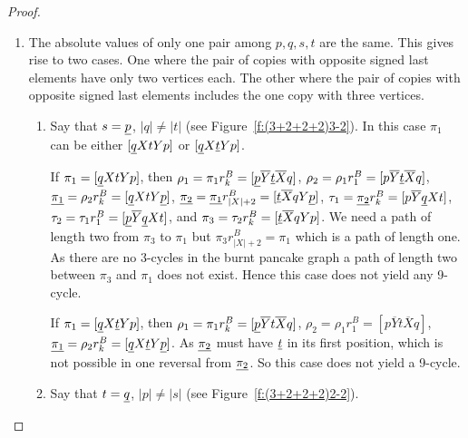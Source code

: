 \documentclass[final]{dmtcs-episciences}
\numberwithin{equation}{section}
\begin{document}
\begin{proof}
\begin{enumerate}
\begin{enumerate}
    \item The absolute values of only one pair among $p,q,s,t$ are the same. This gives rise to two cases. One where the pair of copies with opposite signed last elements have only two vertices each. The other where the pair of copies with opposite signed last elements includes the one copy with three vertices.
    
   
   
    \begin{enumerate}
        \item Say that $s=\uline{p}$, $|q| \neq |t|$ (see Figure~\ref{f:(3+2+2+2)3-2}). In this case $\pi_{1}$ can be either $[\uline{q} X t Y p]$ or $[\uline{q} X \uline{t} Y p]$. 
        
        If $\pi_{1}=[\uline{q} X t Y p]$, then $\rho_{1}=\pi_{1}r^B_k=[\uline{p} \overline{Y} \uline{t} \overline{X} q]$, $\rho_{2}=\rho_{1}r^B_1=[p \overline{Y} \uline{t} \overline{X} q]$, $\uline{\pi_{1}}=\rho_{2}r^B_k=[\uline{q} X t Y \uline{p}]$, $\uline{\pi_{2}}=\uline{\pi_{1}}r^B_{|X|+2}=[\uline{t} \overline{X} q Y \uline{p}]$, $\tau_{1}=\uline{\pi_{2}}r^B_k=[p \overline{Y} \uline{q} X t]$, $\tau_{2}=\tau_{1}r^B_1=[\uline{p} \overline{Y} \uline{q} X t]$, and  $\pi_{3}=\tau_{2}r^B_k=[\uline{t} \overline{X} q Y p]$. We need a path of length two from $\pi_{3}$ to $\pi_{1}$ but $\pi_{3}r^B_{|X|+2}=\pi_{1}$ which is a path of length one. As there are no 3-cycles in the burnt pancake graph a path of length two between $\pi_{3}$ and $\pi_{1}$ does not exist. Hence this case does not yield any 9-cycle.
        
        If $\pi_{1}=[\uline{q} X \uline{t} Y p]$, then $\rho_{1}=\pi_{1}r^B_k=[\uline{p} \overline{Y} t \overline{X} q]$, $\rho_{2}=\rho_{1}r^B_1=[p \overline{Y} t \overline{X} q]$, $\uline{\pi_{1}}=\rho_{2}r^B_k=[\uline{q} X \uline{t} Y \uline{p}]$. As $\uline{\pi_{2}}$ must have $\uline{t}$ in its first position, which is not possible in one reversal from $\uline{\pi_{2}}$. So this case does not yield a 9-cycle.
        
        
        \item Say that $t=\uline{q}$, $|p| \neq |s|$ (see Figure~\ref{f:(3+2+2+2)2-2}).
        

\end{enumerate}
\end{enumerate}
\end{enumerate}
\end{proof}
\end{document}
